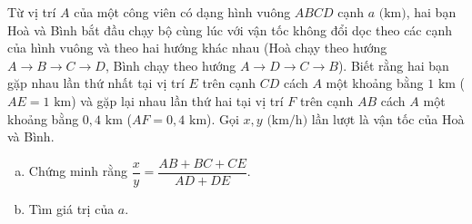 

\begin{bt}%
Từ vị trí $A$ của một công viên có dạng hình vuông $ABCD$ cạnh $a\text{ (km)}$, hai bạn Hoà và Bình bắt đầu chạy bộ cùng lúc với vận tốc không đổi dọc theo các cạnh của hình vuông và theo hai hướng khác nhau (Hoà chạy theo hướng $A \to B \to C \to D$, Bình chạy theo hướng $A \to D \to C \to B$). Biết rằng hai bạn gặp nhau lần thứ nhất tại vị trí $E$ trên cạnh $CD$ cách $A$ một khoảng bằng $1\text{ km}$ ($AE = 1\text{ km}$) và gặp lại nhau lần thứ hai tại vị trí $F$ trên cạnh $AB$ cách $A$ một khoảng bằng $0{,}4\text{ km}$ ($AF = 0{,}4\text{ km}$). Gọi $x, y\text{ (km/h)}$ lần lượt là vận tốc của Hoà và Bình.
\begin{enumerate}[a)]
	\item Chứng minh rằng $\dfrac{x}{y} = \dfrac{AB + BC + CE}{AD + DE}$.
	\item Tìm giá trị của $a$.
\end{enumerate}
\end{bt}
